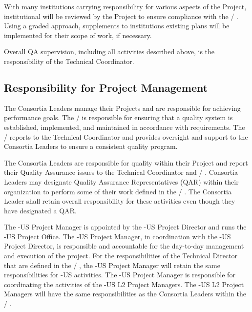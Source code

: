 With many institutions carrying responsibility for various aspects of
the Project, institutional  will be reviewed by the 
Project to ensure compliance with the / . Using a
graded approach, supplements to institutions existing plans will be
implemented for their  scope of work, if necessary.

Overall QA supervision, including all activities described above, is
the responsibility of the  Technical Coordinator.

\subsection{Responsibility for Project Management}

The  Consortia Leaders manage their Projects and are responsible
for achieving performance goals. The /  is responsible for
ensuring that a quality system is established, implemented, and
maintained in accordance with requirements. The /  reports
to the  Technical Coordinator and provides oversight and support
to the Consortia Leaders to ensure a consistent quality program.

The  Consortia Leaders are responsible for quality within their
Project and report their Quality Assurance issues to the 
Technical Coordinator and / .  Consortia Leaders
may designate Quality Assurance Representatives (QAR) within their
organization to perform some of their work defined in the /
. The  Consortia Leader shall retain overall
responsibility for these activities even though they have designated a
QAR.

The -US Project Manager is appointed by the -US Project
Director and runs the -US Project Office. The -US Project
Manager, in coordination with the -US Project Director, is
responsible and accountable for the day-to-day management and
execution of the project. For the responsibilities of the 
Technical Director that are defined in the / , the
-US Project Manager will retain the same responsibilities for
-US activities. The -US Project Manager is responsible for
coordinating the activities of the -US L2 Project Managers. The
-US L2 Project Managers will have the same responsibilities as the
 Consortia Leaders within the / .

